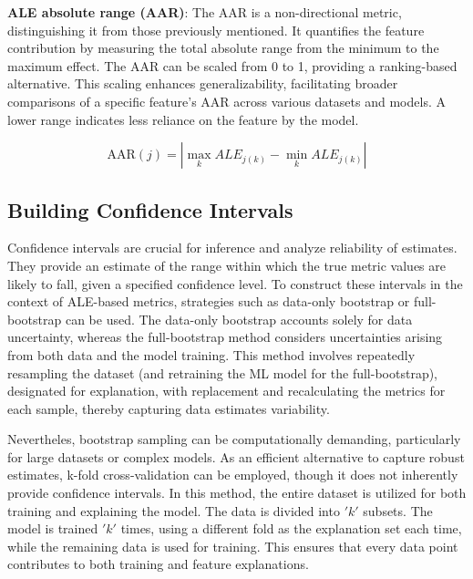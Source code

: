 \textbf{ALE absolute range (AAR)}: The AAR is a non-directional metric, distinguishing it from those previously mentioned. It quantifies the feature contribution by measuring the total absolute range from the minimum to the maximum effect. The AAR can be scaled from 0 to 1, providing a ranking-based alternative. This scaling enhances generalizability, facilitating broader comparisons of a specific feature's AAR across various datasets and models. A lower range indicates less reliance on the feature by the model.

\begin{equation}
\label{eq:AAR}
\text{AAR}(j) = \left| \max_{k} ALE_{j(k)} - \min_{k} ALE_{j(k)} \right|
\end{equation}

\subsection{Building Confidence Intervals}

Confidence intervals are crucial for inference and analyze reliability of estimates. They provide an estimate of the range within which the true metric values are likely to fall, given a specified confidence level. To construct these intervals in the context of ALE-based metrics, strategies such as data-only bootstrap or full-bootstrap can be used. The data-only bootstrap accounts solely for data uncertainty, whereas the full-bootstrap method considers uncertainties arising from both data and the model training. This method involves repeatedly resampling the dataset (and retraining the ML model for the full-bootstrap), designated for explanation, with replacement and recalculating the metrics for each sample, thereby capturing data estimates variability.

Nevertheles, bootstrap sampling can be computationally demanding, particularly for large datasets or complex models. As an efficient alternative to capture robust estimates, k-fold cross-validation can be employed, though it does not inherently provide confidence intervals. In this method, the entire dataset is utilized for both training and explaining the model. The data is divided into \('k'\) subsets. The model is trained \('k'\) times, using a different fold as the explanation set each time, while the remaining data is used for training. This ensures that every data point contributes to both training and feature explanations.

